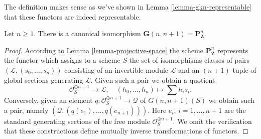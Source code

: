 \noindent
The definition makes sense as we've shown in
Lemma \ref{lemma-gkn-representable}
that these functors are indeed representable.

\begin{lemma}
\label{lemma-projective-space-grassmannian}
Let $n \geq 1$. There is a canonical isomorphism
$\mathbf{G}(n, n + 1) = \mathbf{P}^n_\mathbf{Z}$.
\end{lemma}

\begin{proof}
According to Lemma \ref{lemma-projective-space} the scheme
$\mathbf{P}^n_\mathbf{Z}$ represents the functor
which assigns to a scheme $S$ the set of isomorphisms classes
of pairs $(\mathcal{L}, (s_0, \ldots, s_n))$ consisting of
an invertible module $\mathcal{L}$ and an $(n + 1)$-tuple
of global sections generating $\mathcal{L}$.
Given such a pair we obtain a quotient
$$
\mathcal{O}_S^{\oplus n + 1} \longrightarrow \mathcal{L},\quad
(h_0, \ldots, h_n) \longmapsto \sum h_i s_i.
$$
Conversely, given an element
$q : \mathcal{O}_S^{\oplus n + 1} \to \mathcal{Q}$ of $G(n, n + 1)(S)$
we obtain such a pair, namely $(\mathcal{Q}, (q(e_1), \ldots, q(e_{n + 1})))$.
Here $e_i$, $i = 1, \ldots, n + 1$ are the standard generating sections
of the free module $\mathcal{O}_S^{\oplus n + 1}$.
We omit the verification that these constructions define mutually
inverse transformations of functors.
\end{proof}








